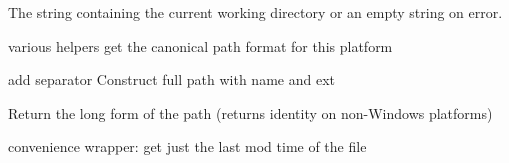 
The string containing the current working directory or an empty string on
error.



\label{wxfilenamegetdircount}



\label{wxfilenamegetdirs}



\label{wxfilenamegetext}



\label{wxfilenamegetformat}


various helpers
get the canonical path format for this platform


\label{wxfilenamegetfullname}



\label{wxfilenamegetfullpath}


add separator Construct full path with name and ext


\label{wxfilenamegethomedir}



\label{wxfilenamegetlongpath}


Return the long form of the path (returns identity on non-Windows platforms)


\label{wxfilenamegetmodificationtime}


convenience wrapper: get just the last mod time of the file


\label{wxfilenamegetname}

